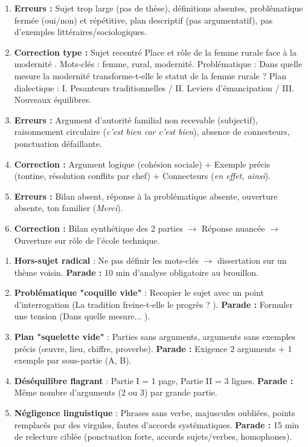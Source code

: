 \documentclass[11pt]{article}
\begin{document}
\begin{corrige}
\begin{enumerate}
\item \textbf{Erreurs :} Sujet trop large (pas de thèse), définitions absentes, problématique fermée (oui/non) et répétitive, plan descriptif (pas argumentatif), pas d'exemples littéraires/sociologiques.
\item \textbf{Correction type :} Sujet recentré \og Place et rôle de la femme rurale face à la modernité \fg. Mots-clés : femme, rural, modernité. Problématique : \og Dans quelle mesure la modernité transforme-t-elle le statut de la femme rurale ? \fg Plan dialectique : I. Pesanteurs traditionnelles / II. Leviers d'émancipation / III. Nouveaux équilibres.
\item \textbf{Erreurs :} Argument d'autorité familial non recevable (subjectif), raisonnement circulaire (\emph{c'est bien car c'est bien}), absence de connecteurs, ponctuation défaillante.
\item \textbf{Correction :} Argument logique (cohésion sociale) + Exemple précis (tontine, résolution conflits par chef) + Connecteurs (\emph{en effet, ainsi}).
\item \textbf{Erreurs :} Bilan absent, réponse à la problématique absente, ouverture absente, ton familier (\emph{Merci}).
\item \textbf{Correction :} Bilan synthétique des 2 parties $\rightarrow$ Réponse nuancée $\rightarrow$ Ouverture sur rôle de l'école technique.
\end{enumerate}
\end{corrige}

\begin{attention}
\begin{enumerate}
\item \textbf{Hors-sujet radical} : Ne pas définir les mots-clés $\rightarrow$ dissertation sur un thème voisin. \textbf{Parade :} 10 min d'analyse obligatoire au brouillon.
\item \textbf{Problématique "coquille vide"} : Recopier le sujet avec un point d'interrogation (\og La tradition freine-t-elle le progrès ? \fg). \textbf{Parade :} Formuler une tension (\og Dans quelle mesure... \fg).
\item \textbf{Plan "squelette vide"} : Parties sans arguments, arguments sans exemples précis (œuvre, lieu, chiffre, proverbe). \textbf{Parade :} Exigence 2 arguments + 1 exemple par sous-partie (A, B).
\item \textbf{Déséquilibre flagrant} : Partie I = 1 page, Partie II = 3 lignes. \textbf{Parade :} Même nombre d'arguments (2 ou 3) par grande partie.
\item \textbf{Négligence linguistique} : Phrases sans verbe, majuscules oubliées, points remplacés par des virgules, fautes d'accords systématiques. \textbf{Parade :} 15 min de relecture ciblée (ponctuation forte, accords sujets/verbes, homophones).
\end{enumerate}
\end{attention}
\end{document}
